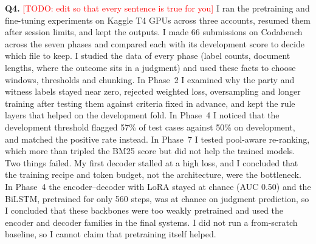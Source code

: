 \documentclass[10pt,a4paper]{article}
\newcommand{\todo}[1]{\textcolor{red}{[TODO: #1]}}
\begin{document}
\medskip\noindent\textbf{Q4.} \todo{edit so that every sentence is true for you} I ran the pretraining and fine-tuning experiments on Kaggle T4 GPUs across three accounts, resumed them after session limits, and kept the outputs. I made 66 submissions on Codabench across the seven phases and compared each with its development score to decide which file to keep. I studied the data of every phase (label counts, document lengths, where the outcome sits in a judgment) and used these facts to choose windows, thresholds and chunking. In Phase~2 I examined why the party and witness labels stayed near zero, rejected weighted loss, oversampling and longer training after testing them against criteria fixed in advance, and kept the rule layers that helped on the development fold. In Phase~4 I noticed that the development threshold flagged 57\% of test cases against 50\% on development, and matched the positive rate instead. In Phase~7 I tested pool-aware re-ranking, which more than tripled the BM25 score but did not help the trained models. Two things failed. My first decoder stalled at a high loss, and I concluded that the training recipe and token budget, not the architecture, were the bottleneck. In Phase~4 the encoder--decoder with LoRA stayed at chance (AUC 0.50) and the BiLSTM, pretrained for only 560 steps, was at chance on judgment prediction, so I concluded that these backbones were too weakly pretrained and used the encoder and decoder families in the final systems. I did not run a from-scratch baseline, so I cannot claim that pretraining itself helped.
\end{document}
